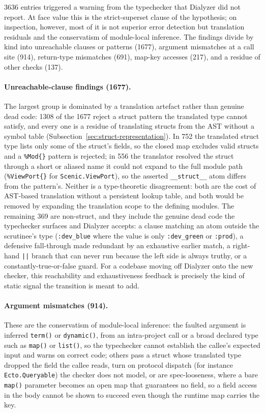 \num{3636} entries triggered a warning from the typechecker that Dialyzer did not report.
At face value this is the strict-superset clause of the hypothesis; on inspection, however, most of it is not superior error detection but translation residuals and the conservatism of module-local inference.
The findings divide by kind into unreachable clauses or patterns (\num{1677}), argument mismatches at a call site (914), return-type mismatches (691), map-key accesses (217), and a residue of other checks (137).

\paragraph{Unreachable-clause findings (\num{1677}).}
The largest group is dominated by a translation artefact rather than genuine dead code: \num{1308} of the \num{1677} reject a struct pattern the translated type cannot satisfy, and every one is a residue of translating structs from the AST without a symbol table (Subsection~\ref{sec:struct-representation}).
In 752 the translated struct type lists only some of the struct's fields, so the closed map excludes valid structs and a \texttt{\%Mod\{\}} pattern is rejected; in 556 the translator resolved the struct through a short or aliased name it could not expand to the full module path (\texttt{\%ViewPort\{\}} for \texttt{Scenic.ViewPort}), so the asserted \texttt{\_\_struct\_\_} atom differs from the pattern's.
Neither is a type-theoretic disagreement: both are the cost of AST-based translation without a persistent lookup table, and both would be removed by expanding the translation scope to the defining modules.
The remaining 369 are non-struct, and they include the genuine dead code the typechecker surfaces and Dialyzer accepts: a clause matching an atom outside the scrutinee's type (\texttt{:dev\_blue} where the value is only \texttt{:dev\_green} or \texttt{:prod}), a defensive fall-through made redundant by an exhaustive earlier match, a right-hand \texttt{||} branch that can never run because the left side is always truthy, or a constantly-true-or-false guard.
For a codebase moving off Dialyzer onto the new checker, this reachability and exhaustiveness feedback is precisely the kind of static signal the transition is meant to add.

\paragraph{Argument mismatches (914).}
These are the conservatism of module-local inference: the faulted argument is inferred \texttt{term()} or \texttt{dynamic()}, from an intra-project call or a broad declared type such as \texttt{map()} or \texttt{list()}, so the typechecker cannot establish the callee's expected input and warns on correct code; others pass a struct whose translated type dropped the field the callee reads, turn on protocol dispatch (for instance \texttt{Ecto.Queryable}) the checker does not model, or are spec-looseness, where a bare \texttt{map()} parameter becomes an open map that guarantees no field, so a field access in the body cannot be shown to succeed even though the runtime map carries the key.

